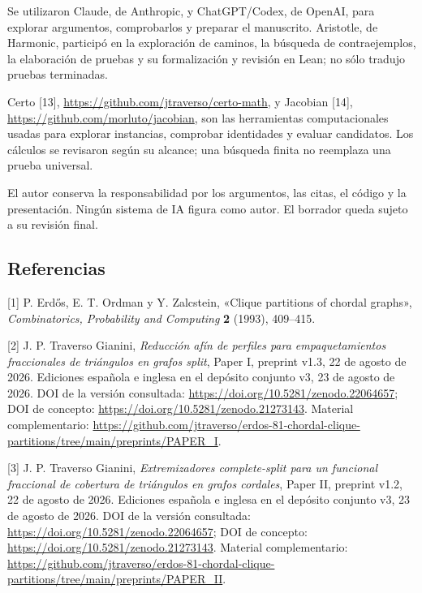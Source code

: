 \documentclass[spanish,11pt,a4paper]{article}
\begin{document}
Se utilizaron Claude, de Anthropic, y ChatGPT/Codex, de OpenAI, para explorar argumentos, comprobarlos y preparar el manuscrito. Aristotle, de Harmonic, participó en la exploración de caminos, la búsqueda de contraejemplos, la elaboración de pruebas y su formalización y revisión en Lean; no sólo tradujo pruebas terminadas.

Certo {[}13{]}, \url{https://github.com/jtraverso/certo-math}, y Jacobian {[}14{]}, \url{https://github.com/morluto/jacobian}, son las herramientas computacionales usadas para explorar instancias, comprobar identidades y evaluar candidatos. Los cálculos se revisaron según su alcance; una búsqueda finita no reemplaza una prueba universal.

El autor conserva la responsabilidad por los argumentos, las citas, el código y la presentación. Ningún sistema de IA figura como autor. El borrador queda sujeto a su revisión final.

\clearpage
\subsection{Referencias}
\begingroup\small\setlength{\parskip}{4pt}\label{referencias}

{[}1{]} P. Erdős, E. T. Ordman y Y. Zalcstein, «Clique partitions of chordal graphs», \emph{Combinatorics, Probability and Computing} \textbf{2} (1993), 409--415.

{[}2{]} J. P. Traverso Gianini, \emph{Reducción afín de perfiles para empaquetamientos fraccionales de triángulos en grafos split}, Paper I, preprint v1.3, 22 de agosto de 2026. Ediciones española e inglesa en el depósito conjunto v3, 23 de agosto de 2026. DOI de la versión consultada: \url{https://doi.org/10.5281/zenodo.22064657}; DOI de concepto: \url{https://doi.org/10.5281/zenodo.21273143}. Material complementario: \url{https://github.com/jtraverso/erdos-81-chordal-clique-partitions/tree/main/preprints/PAPER_I}.

{[}3{]} J. P. Traverso Gianini, \emph{Extremizadores complete-split para un funcional fraccional de cobertura de triángulos en grafos cordales}, Paper II, preprint v1.2, 22 de agosto de 2026. Ediciones española e inglesa en el depósito conjunto v3, 23 de agosto de 2026. DOI de la versión consultada: \url{https://doi.org/10.5281/zenodo.22064657}; DOI de concepto: \url{https://doi.org/10.5281/zenodo.21273143}. Material complementario: \url{https://github.com/jtraverso/erdos-81-chordal-clique-partitions/tree/main/preprints/PAPER_II}.
\end{document}
